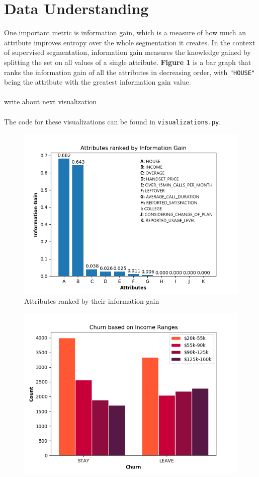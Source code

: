 \documentclass[12pt, notitlepage]{article}
\begin{document}
\section{Data Understanding}
One important metric is information gain, which is a measure of how much an attribute improves entropy over the whole segmentation it creates. In the context of supervised segmentation, information gain measures the knowledge gained by splitting the set on all values of a single attribute. \textbf{Figure 1} is a bar graph that ranks the information gain of all the attributes in decreasing order, with \texttt{"HOUSE"} being the attribute with the greatest information gain value.\\\\
write about next visualization\\\\
The code for these visualizations can be found in \texttt{visualizations.py}. 
\begin{figure}[H]
	\centering
	\includegraphics[scale=0.8]{InformationGain.png}
	\caption{Attributes ranked by their information gain}
\end{figure}
\begin{figure}[H]
	\centering 
	\includegraphics[scale=0.8]{IncomeVsChurn.png}
\end{figure}
\end{document}
